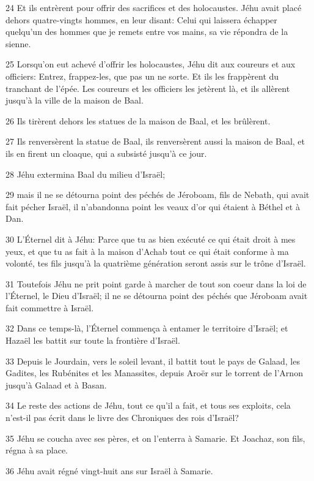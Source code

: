 \par 24 Et ils entrèrent pour offrir des sacrifices et des holocaustes. Jéhu avait placé dehors quatre-vingts hommes, en leur disant: Celui qui laissera échapper quelqu'un des hommes que je remets entre vos mains, sa vie répondra de la sienne.
\par 25 Lorsqu'on eut achevé d'offrir les holocaustes, Jéhu dit aux coureurs et aux officiers: Entrez, frappez-les, que pas un ne sorte. Et ils les frappèrent du tranchant de l'épée. Les coureurs et les officiers les jetèrent là, et ils allèrent jusqu'à la ville de la maison de Baal.
\par 26 Ils tirèrent dehors les statues de la maison de Baal, et les brûlèrent.
\par 27 Ils renversèrent la statue de Baal, ils renversèrent aussi la maison de Baal, et ils en firent un cloaque, qui a subsisté jusqu'à ce jour.
\par 28 Jéhu extermina Baal du milieu d'Israël;
\par 29 mais il ne se détourna point des péchés de Jéroboam, fils de Nebath, qui avait fait pécher Israël, il n'abandonna point les veaux d'or qui étaient à Béthel et à Dan.
\par 30 L'Éternel dit à Jéhu: Parce que tu as bien exécuté ce qui était droit à mes yeux, et que tu as fait à la maison d'Achab tout ce qui était conforme à ma volonté, tes fils jusqu'à la quatrième génération seront assis sur le trône d'Israël.
\par 31 Toutefois Jéhu ne prit point garde à marcher de tout son coeur dans la loi de l'Éternel, le Dieu d'Israël; il ne se détourna point des péchés que Jéroboam avait fait commettre à Israël.
\par 32 Dans ce temps-là, l'Éternel commença à entamer le territoire d'Israël; et Hazaël les battit sur toute la frontière d'Israël.
\par 33 Depuis le Jourdain, vers le soleil levant, il battit tout le pays de Galaad, les Gadites, les Rubénites et les Manassites, depuis Aroër sur le torrent de l'Arnon jusqu'à Galaad et à Basan.
\par 34 Le reste des actions de Jéhu, tout ce qu'il a fait, et tous ses exploits, cela n'est-il pas écrit dans le livre des Chroniques des rois d'Israël?
\par 35 Jéhu se coucha avec ses pères, et on l'enterra à Samarie. Et Joachaz, son fils, régna à sa place.
\par 36 Jéhu avait régné vingt-huit ans sur Israël à Samarie.

